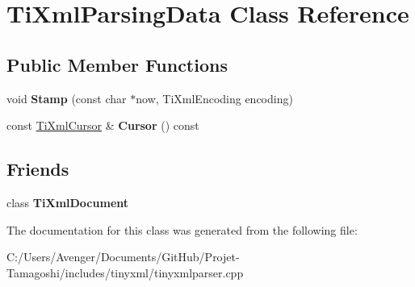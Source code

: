 \hypertarget{class_ti_xml_parsing_data}{\section{Ti\+Xml\+Parsing\+Data Class Reference}
\label{class_ti_xml_parsing_data}
}
\subsection*{Public Member Functions}
\begin{DoxyCompactItemize}
\item 
\hypertarget{class_ti_xml_parsing_data_a65cee8ab77a36c605db08c84b4c30a7d}{void {\bfseries Stamp} (const char $\ast$now, Ti\+Xml\+Encoding encoding)}\label{class_ti_xml_parsing_data_a65cee8ab77a36c605db08c84b4c30a7d}

\item 
\hypertarget{class_ti_xml_parsing_data_a9e63d965fdb53ff4ac711e105269e918}{const \hyperlink{struct_ti_xml_cursor}{Ti\+Xml\+Cursor} \& {\bfseries Cursor} () const }\label{class_ti_xml_parsing_data_a9e63d965fdb53ff4ac711e105269e918}

\end{DoxyCompactItemize}
\subsection*{Friends}
\begin{DoxyCompactItemize}
\item 
\hypertarget{class_ti_xml_parsing_data_a173617f6dfe902cf484ce5552b950475}{class {\bfseries Ti\+Xml\+Document}}\label{class_ti_xml_parsing_data_a173617f6dfe902cf484ce5552b950475}

\end{DoxyCompactItemize}


The documentation for this class was generated from the following file\+:\begin{DoxyCompactItemize}
\item 
C\+:/\+Users/\+Avenger/\+Documents/\+Git\+Hub/\+Projet-\/\+Tamagoshi/includes/tinyxml/tinyxmlparser.\+cpp\end{DoxyCompactItemize}
